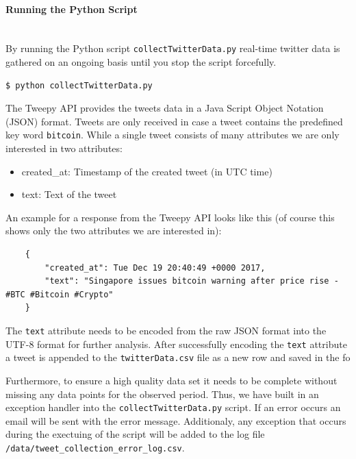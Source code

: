 \documentclass[a4paper,12pt]{article}
\begin{document}
\begin{spacing}{1.2}
\paragraph{Running the Python Script}\mbox{}\\{}
By running the Python script \verb|collectTwitterData.py| real-time twitter data is gathered on an ongoing basis until you stop the script forcefully.
\begin{lstlisting}[language=bash]
    $ python collectTwitterData.py
    \end{lstlisting}

The Tweepy API provides the tweets data in a Java Script Object Notation (JSON) format. Tweets are only received in case a tweet contains the predefined key word \verb|bitcoin|. While a single tweet consists of many attributes we are only interested in two attributes:
\begin{itemize}
    \item created\_at: Timestamp of the created tweet (in UTC time)
    \item text: Text of the tweet
\end{itemize}

An example for a response from the Tweepy API looks like this (of course this shows only the two attributes we are interested in):
\begin{lstlisting}
    {
        "created_at": Tue Dec 19 20:40:49 +0000 2017, 
        "text": "Singapore issues bitcoin warning after price rise - #BTC #Bitcoin #Crypto"
    }
\end{lstlisting}

The \verb|text| attribute needs to be encoded from the raw JSON format into the UTF-8 format for further analysis. After successfully encoding the \verb|text| attribute a tweet is appended to the \verb|twitterData.csv| file as a new row and saved in the fo

Furthermore, to ensure a high quality data set it needs to be complete without missing any data points for the observed period. Thus, we have built in an exception handler into the \verb|collectTwitterData.py| script. If an error occurs an email will be sent with the error message. Additionaly, any exception that occurs during the exectuing of the script will be added to the log file \verb|/data/tweet_collection_error_log.csv|.


\end{spacing}
\end{document}
